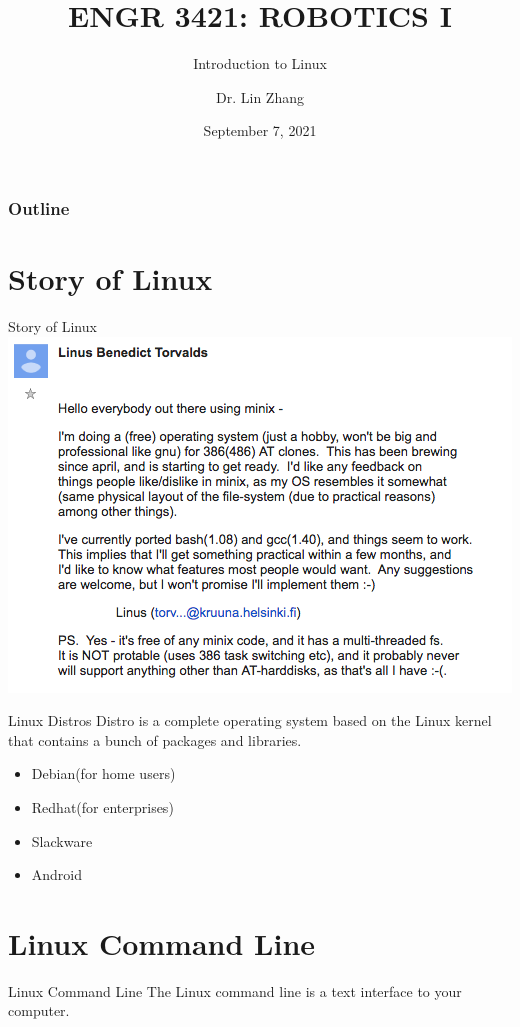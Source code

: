 \documentclass[12pt,letterpaper]{beamer}
\title[Robotics I]
{ENGR 3421: ROBOTICS I}
\subtitle{Introduction to Linux}
\author[Zhang, Lin]
{Dr. Lin Zhang}
\institute[UCA] %
{
  Department of Physics and Astronomy\\
  University of Central Arkansas
}
\date[Robotics1 2021] %
{September 7, 2021}
\begin{document}
\frame{\titlepage}

\begin{frame}
\frametitle{Outline}
\tableofcontents
\end{frame}

\section{Story of Linux}

\begin{frame}{Story of Linux}
    {\centering
        \includegraphics[width=0.8\linewidth]{linus_torvald_first_linux_email}
    }
\end{frame}

\begin{frame}{Linux Distros}
    Distro is a complete operating system based on the Linux kernel that contains a bunch of packages and libraries.
    \begin{itemize} 
        \item Debian(for home users)
        \item Redhat(for enterprises)
        \item Slackware
        \item Android
    \end{itemize} 
\end{frame}

\section{Linux Command Line}
\begin{frame}{Linux Command Line}
    The Linux command line is a text interface to your computer.
\end{frame}
\end{document}
